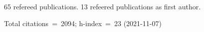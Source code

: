 65 refereed publications. 13 refeered publications as first author.

Total citations~=~2094; h-index~=~23 (2021-11-07)